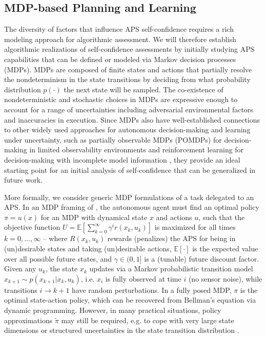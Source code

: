 \subsection{MDP-based Planning and Learning}
The diversity of factors that influence APS self-confidence requires a rich modeling approach for algorithmic assessment. We will therefore establish algorithmic realizations of self-confidence assessments by initially studying APS capabilities that can be defined or modeled via Markov decision processes (MDPs). MDPs are composed of finite states and actions that partially resolve the nondeterminism in the state transitions by deciding from what probability distribution $p(\cdot)$ the next state will be sampled. The co-existence of nondeterministic and stochastic choices in MDPs are expressive enough to account for a range of uncertainties including adversarial environmental factors and inaccuracies in execution. %
Since MDPs also have well-established connections to other widely used approaches for autonomous decision-making and learning under uncertainty, such as partially observable MDPs (POMDPs) for decision-making in limited observability environments and reinforcement learning for decision-making with incomplete model information \cite{Kochenderfer2015-uu}, they provide an ideal starting point for an initial analysis of self-confidence that can be generalized in future work. 

More formally, we consider generic MDP formulations of a task \task{} delegated to an APS. In an MDP framing of \task{}, the autonomous agent must find an optimal policy $\pi = u(x)$ for an MDP with dynamical state $x$ and actions $u$, such that the objective function
$U = \mathbb{E} \left[\sum_{k=0}^{\infty} \gamma^i r(x_k,u_k) \right]$ is maximized for all times $k=0,...,\infty$ --  
where $R(x_k,u_k)$ rewards (penalizes) the APS for being in (un)desirable states and taking (un)desirable actions, $\mathbb{E}[\cdot]$ is the expected value over all possible future states, and $\gamma \in (0,1]$ is a (tunable) future discount factor. 
Given any $u_k$, the state $x_k$ updates via a Markov probabilistic transition model $x_{k+1} \sim p(x_{k+1}|x_{k},u_{k})$,  
i.e. $x_{i}$ is fully observed at time $i$ (no sensor noise), while transitions $i\rightarrow k+1$ have random perturbations.
In a fully posed MDP, $\pi$ is the optimal state-action policy, which can be recovered from Bellman's equation via dynamic programming. 
However, in many practical situations, policy approximations $\tilde{\pi}$ may still be required, e.g. to cope with very large state dimensions or structured uncertainties in the state transition distribution \cite{Kochenderfer2015-uu}. 
    
